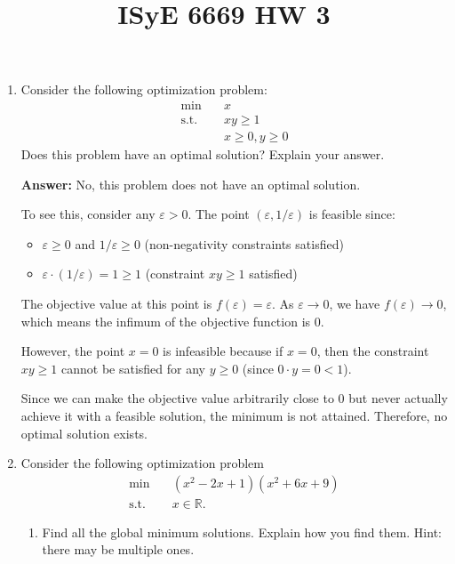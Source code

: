 \documentclass{article}
\title{ISyE 6669 HW 3}
\date{}
\begin{document}
\maketitle


\begin{enumerate}

\item Consider the following optimization problem:
\begin{align*}
\min \quad & x \\
\text{s.t.}\quad & xy \geq 1\\
\text{}\quad & x \geq 0, y \geq 0
\end{align*}
Does this problem have an optimal solution? Explain your answer.

\textbf{Answer:} No, this problem does not have an optimal solution.

To see this, consider any $\varepsilon > 0$. The point $(\varepsilon, 1/\varepsilon)$ is feasible since:
\begin{itemize}
    \item $\varepsilon \geq 0$ and $1/\varepsilon \geq 0$ (non-negativity constraints satisfied)
    \item $\varepsilon \cdot (1/\varepsilon) = 1 \geq 1$ (constraint $xy \geq 1$ satisfied)
\end{itemize}

The objective value at this point is $f(\varepsilon) = \varepsilon$. As $\varepsilon \to 0$, we have $f(\varepsilon) \to 0$, which means the infimum of the objective function is 0.

However, the point $x = 0$ is infeasible because if $x = 0$, then the constraint $xy \geq 1$ cannot be satisfied for any $y \geq 0$ (since $0 \cdot y = 0 < 1$).

Since we can make the objective value arbitrarily close to 0 but never actually achieve it with a feasible solution, the minimum is not attained. Therefore, no optimal solution exists.

\item Consider the following optimization problem
\begin{align*}
    \min \quad & (x^2 - 2x + 1)(x^2 + 6x + 9) \\
    \text{s.t.} \quad & x \in \mathbb{R}.
\end{align*}
\begin{enumerate}
    \item Find all the global minimum solutions. Explain how you find them. Hint: there may be multiple ones. 
    

\end{enumerate}
\end{enumerate}
\end{document}
